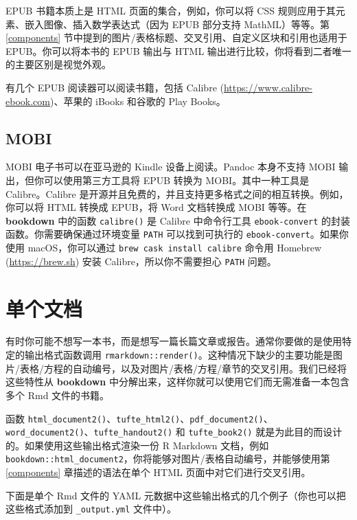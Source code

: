 \documentclass[
  12pt,
]{krantz}
\theoremstyle{definition}
\theoremstyle{definition}
\theoremstyle{definition}
\theoremstyle{definition}
\theoremstyle{remark}
\begin{document}
EPUB 书籍本质上是 HTML 页面的集合，例如，你可以将 CSS 规则应用于其元素、嵌入图像、插入数学表达式（因为 EPUB 部分支持 MathML）等等。第 \ref{components} 节中提到的图片/表格标题、交叉引用、自定义区块和引用也适用于 EPUB。你可以将本书的 EPUB 输出与 HTML 输出进行比较，你将看到二者唯一的主要区别是视觉外观。

有几个 EPUB 阅读器可以阅读书籍，包括 Calibre (\url{https://www.calibre-ebook.com})、苹果的 iBooks 和谷歌的 Play Books。

\hypertarget{mobi}{%
\subsection{MOBI}\label{mobi}}

MOBI 电子书可以在亚马逊的 Kindle 设备上阅读。Pandoc 本身不支持 MOBI 输出，但你可以使用第三方工具将 EPUB 转换为 MOBI。其中一种工具是 Calibre。Calibre 是开源并且免费的，并且支持更多格式之间的相互转换。例如，你可以将 HTML 转换成 EPUB，将 Word 文档转换成 MOBI 等等。在 \textbf{bookdown} 中的函数 \texttt{calibre()} 是 Calibre 中命令行工具 \texttt{ebook-convert} 的封装函数。你需要确保通过环境变量 \texttt{PATH} 可以找到可执行的 \texttt{ebook-convert}。如果你使用 macOS，你可以通过 \texttt{brew\ cask\ install\ calibre} 命令用 Homebrew (\url{https://brew.sh}) 安装 Calibre，所以你不需要担心 \texttt{PATH} 问题。

\hypertarget{a-single-document}{%
\section{单个文档}\label{a-single-document}}

有时你可能不想写一本书，而是想写一篇长篇文章或报告。通常你要做的是使用特定的输出格式函数调用 \texttt{rmarkdown::render()}。这种情况下缺少的主要功能是图片/表格/方程的自动编号，以及对图片/表格/方程/章节的交叉引用。我们已经将这些特性从 \textbf{bookdown} 中分解出来，这样你就可以使用它们而无需准备一本包含多个 Rmd 文件的书籍。

函数 \texttt{html\_document2()}、\texttt{tufte\_html2()}、\texttt{pdf\_document2()}、\texttt{word\_document2()}、\texttt{tufte\_handout2()} 和 \texttt{tufte\_book2()} 就是为此目的而设计的。如果使用这些输出格式渲染一份 R Markdown 文档，例如 \texttt{bookdown::html\_document2}，你将能够对图片/表格自动编号，并能够使用第 \ref{components} 章描述的语法在单个 HTML 页面中对它们进行交叉引用。

下面是单个 Rmd 文件的 YAML 元数据中这些输出格式的几个例子（你也可以把这些格式添加到 \texttt{\_output.yml} 文件中）。
\end{document}
